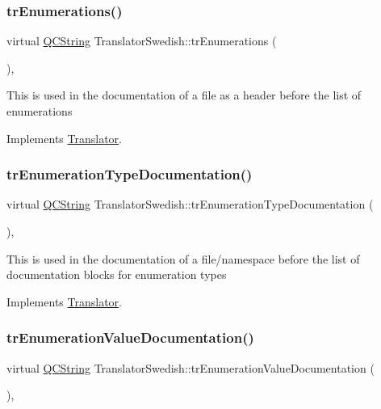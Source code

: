 \subsubsection{\texorpdfstring{trEnumerations()}{trEnumerations()}}
{\footnotesize\ttfamily virtual \mbox{\hyperlink{class_q_c_string}{Q\+C\+String}} Translator\+Swedish\+::tr\+Enumerations (\begin{DoxyParamCaption}{ }\end{DoxyParamCaption})\hspace{0.3cm}{\ttfamily [inline]}, {\ttfamily [virtual]}}

This is used in the documentation of a file as a header before the list of enumerations 

Implements \mbox{\hyperlink{class_translator}{Translator}}.

\mbox{\label{class_translator_swedish_a1f431ab3cd15c806c686532be6058672}} 
\subsubsection{\texorpdfstring{trEnumerationTypeDocumentation()}{trEnumerationTypeDocumentation()}}
{\footnotesize\ttfamily virtual \mbox{\hyperlink{class_q_c_string}{Q\+C\+String}} Translator\+Swedish\+::tr\+Enumeration\+Type\+Documentation (\begin{DoxyParamCaption}{ }\end{DoxyParamCaption})\hspace{0.3cm}{\ttfamily [inline]}, {\ttfamily [virtual]}}

This is used in the documentation of a file/namespace before the list of documentation blocks for enumeration types 

Implements \mbox{\hyperlink{class_translator}{Translator}}.

\mbox{\label{class_translator_swedish_ad3a3c591bdc3e9625b85a70747a05065}} 
\subsubsection{\texorpdfstring{trEnumerationValueDocumentation()}{trEnumerationValueDocumentation()}}
{\footnotesize\ttfamily virtual \mbox{\hyperlink{class_q_c_string}{Q\+C\+String}} Translator\+Swedish\+::tr\+Enumeration\+Value\+Documentation (\begin{DoxyParamCaption}{ }\end{DoxyParamCaption})\hspace{0.3cm}{\ttfamily [inline]}, {\ttfamily [virtual]}}

